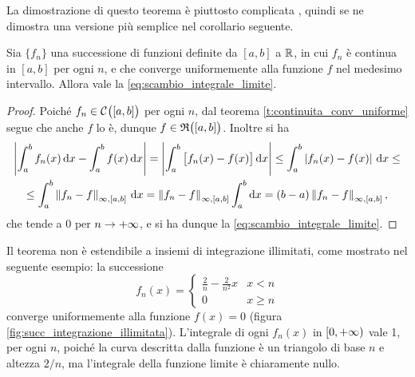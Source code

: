 La dimostrazione di questo teorema è piuttosto complicata%
, quindi se ne dimostra una versione più semplice nel corollario seguente.
\begin{corollario}
Sia $\{f_n\}$ una successione di funzioni definite da $[a,b]$ a $\mathbb{R}$, in cui $f_n$ è continua in $[a,b]$ per ogni $n$, e che converge uniformemente alla funzione $f$ nel medesimo intervallo. Allora vale la \eqref{eq:scambio_integrale_limite}.
\end{corollario}
\begin{proof}
Poiché $f_n\in\mathcal{C}^{{}}\big([a,b]\big)$ per ogni $n$, dal teorema \ref{t:continuita_conv_uniforme} segue che anche $f$ lo è, dunque $f\in\mathfrak{R}\big([a,b]\big)$. Inoltre si ha
\begin{multline*}
\left|{\int_a^bf_n(x)\,\textup{d} x-\int_a^bf(x)\,\textup{d} x}\right|=\left|{\int_a^b\big[f_n(x)-f(x)\big]\,\textup{d} x}\right|\leq\int_a^b\left|{f_n(x)-f(x)}\right|\,\textup{d} x\leq\\
\leq\int_a^b\left\|{f_n-f}\right\|_{\infty,[a,b]}\,\textup{d} x=\left\|{f_n-f}\right\|_{\infty,[a,b]}\int_a^b\textup{d} x=(b-a)\left\|{f_n-f}\right\|_{\infty,[a,b]},
\end{multline*}
che tende a 0 per $n\to+\infty$, e si ha dunque la \eqref{eq:scambio_integrale_limite}.
\end{proof}
Il teorema non è estendibile a insiemi di integrazione illimitati, come mostrato nel seguente esempio: la successione
\[
f_n(x)=\begin{cases}\frac2{n}-\frac2{n^2}x&x<n\\0&x\geq n\end{cases}
\]
converge uniformemente alla funzione $f(x)=0$ (figura \ref{fig:succ_integrazione_illimitata}). L'integrale di ogni $f_n(x)$ in $[0,+\infty)$ vale 1, per ogni $n$, poiché la curva descritta dalla funzione è un triangolo di base $n$ e altezza $2/n$, ma l'integrale della funzione limite è chiaramente nullo.


